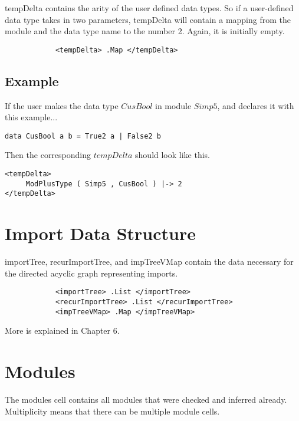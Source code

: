 tempDelta contains the arity of the user defined data types. So if a user-defined data type takes in two parameters, tempDelta will contain a mapping from the module and the data type name to the number 2. Again, it is initially empty.

\begin{lstlisting}
            <tempDelta> .Map </tempDelta>
\end{lstlisting}

\subsection{Example}
If the user makes the data type $CusBool$ in module $Simp5$, and declares it with this example...
\begin{lstlisting}
data CusBool a b = True2 a | False2 b
\end{lstlisting}

Then the corresponding $tempDelta$ should look like this.

\begin{lstlisting}
<tempDelta>
     ModPlusType ( Simp5 , CusBool ) |-> 2
</tempDelta>
\end{lstlisting}

\section{Import Data Structure}

importTree, recurImportTree, and impTreeVMap contain the data necessary for the directed acyclic graph representing imports.

\begin{lstlisting}
            <importTree> .List </importTree>
            <recurImportTree> .List </recurImportTree>
            <impTreeVMap> .Map </impTreeVMap>
\end{lstlisting}

More is explained in Chapter 6.

\section{Modules}

The modules cell contains all modules that were checked and inferred already. Multiplicity means that there can be multiple module cells.

